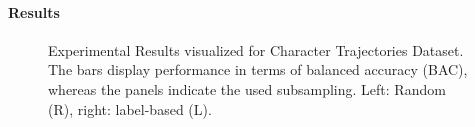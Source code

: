 \documentclass{article}
\begin{document}
\paragraph{Results}
%
\begin{figure}[tbp]
  \caption{Experimental Results visualized for Character Trajectories Dataset.
  The bars display performance in terms of balanced accuracy (BAC), whereas the panels indicate the used subsampling. Left: Random (R), right: label-based (L).}
  \label{fig:results_main}
\end{figure}
\end{document}
